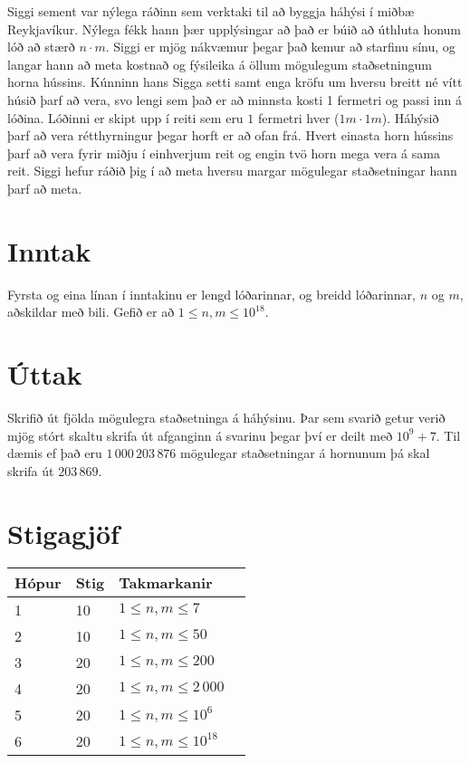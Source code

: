Siggi sement var nýlega ráðinn sem verktaki til að byggja háhýsi í miðbæ Reykjavíkur.
Nýlega fékk hann þær upplýsingar að það er búið að úthluta honum lóð að stærð $n \cdot m$.
Siggi er mjög nákvæmur þegar það kemur að starfinu sínu, og langar hann að meta kostnað og fýsileika á öllum mögulegum staðsetningum horna hússins.
Kúnninn hans Sigga setti samt enga kröfu um hversu breitt né vítt húsið þarf að vera, svo lengi sem það er að minnsta kosti 1 fermetri og passi inn á lóðina.
Lóðinni er skipt upp í reiti sem eru $1$ fermetri hver ($1m \cdot 1m$). Háhýsið þarf að vera rétthyrningur þegar horft er að ofan frá.
Hvert einasta horn hússins þarf að vera fyrir miðju í einhverjum reit og engin tvö horn mega vera á sama reit.
Siggi hefur ráðið þig í að meta hversu margar mögulegar staðsetningar hann þarf að meta.

\section*{Inntak}
Fyrsta og eina línan í inntakinu er lengd lóðarinnar, og breidd lóðarinnar, $n$ og $m$, aðskildar með bili.
Gefið er að $1 \leq n, m \leq 10^{18}$.

\section*{Úttak}
Skrifið út fjölda mögulegra staðsetninga á háhýsinu. Þar sem svarið getur verið mjög stórt skaltu skrifa út afganginn á svarinu þegar því er deilt með $10^9 + 7$.
Til dæmis ef það eru $1\,000\,203\,876$ mögulegar staðsetningar á hornunum þá skal skrifa út $203\,869$.

\section*{Stigagjöf}
\begin{tabular}{|l|l|l|l|}
\hline
Hópur & Stig & Takmarkanir \\ \hline
1 & 10 & $1 \leq n, m \leq 7$ \\
\hline
2 & 10 & $1 \leq n, m \leq 50$ \\
\hline
3 & 20 & $1 \leq n, m \leq 200$ \\
\hline
4 & 20 & $1 \leq n, m \leq 2\,000$ \\
\hline
5 & 20 & $1 \leq n, m \leq 10^6$ \\
\hline
6 & 20 & $1 \leq n, m \leq 10^{18}$ \\
\hline
\end{tabular}
